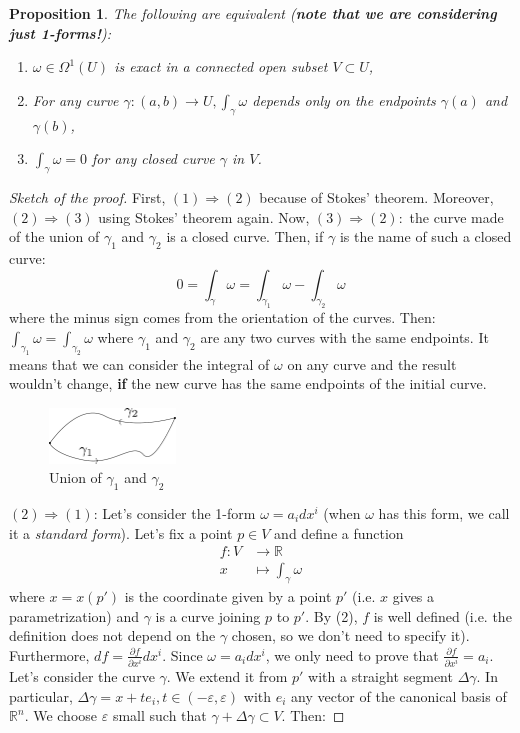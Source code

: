 \documentclass[a4paper,11pt,titlepage, article, oneside]{memoir}
\numberwithin{equation}{section}
\newtheorem{proposition}[theorem]{Proposition}
\theoremstyle{definition}
\theoremstyle{remark}
\newcommand{\rfield}{\mathbb{R}}
\begin{document}
\begin{proposition} \label{propex1forms}
  The following are equivalent (\textbf{note that we are considering just 1-forms!}):
  \begin{enumerate}
    \item $\omega \in \Omega^1(U)$ is exact in a connected open subset $V \subset U$,
    \item For any curve $\gamma \colon (a, b) \rightarrow U, \int_{\gamma} \omega$ depends only on the endpoints $\gamma(a)$ and $\gamma(b)$,
    \item $\int_{\gamma} \omega = 0$ for any closed curve $\gamma$ in $V$.
  \end{enumerate}
\end{proposition}
\begin{proof}[Sketch of the proof]
First, $(1) \Rightarrow (2)$ because of Stokes' theorem. Moreover, $(2) \Rightarrow (3)$ using Stokes' theorem again. Now, $(3) \Rightarrow (2):$ the curve made of the union of $\gamma_1$ and $\gamma_2$ is a closed curve. Then, if $\gamma$ is the name of such a closed curve:
$$0 = \int_{\gamma} \omega = \int_{\gamma_1} \omega - \int_{\gamma_2} \omega$$
where the minus sign comes from the orientation of the curves.
Then: $\int_{\gamma_1} \omega = \int_{\gamma_2} \omega$ where $\gamma_1$ and $\gamma_2$ are any two curves with the same endpoints. It means that we can consider the integral of $\omega$ on any curve and the result  wouldn't change, \textbf{if} the new curve has the same endpoints of the initial curve.
\begin{figure}[H] \label{Fig:closedcurve}
     \centering
     \includegraphics[width=0.3\textwidth]{Images/closedcurve.pdf}
     \caption{Union of $\gamma_1$ and $\gamma_2$}
\end{figure}
$(2) \Rightarrow (1)$: Let's consider the 1-form $\omega = a_i dx^i$ (when $\omega$ has this form, we call it a \textit{standard form}). Let's fix a point $p \in V$ and define a function
\begin{align*}
f \colon V &\rightarrow \rfield \\
x &\mapsto \int_{\gamma} \omega
\end{align*}
where $x = x(p')$ is the coordinate given by a point $p'$ (i.e. $x$ gives a parametrization) and $\gamma$ is a curve joining $p$ to $p'$. By (2), $f$ is well defined (i.e. the definition does not depend on the $\gamma$ chosen, so we don't need to specify it). Furthermore, $df = \frac{\partial f}{\partial x^i} dx^i$. Since $\omega = a_i dx^i$, we only need  to prove that $\frac{\partial f}{\partial x^i} = a_i$. Let's consider the curve $\gamma$. We extend it from $p'$ with a straight segment $\Delta \gamma$. In particular, $\Delta \gamma = x + t e_i, t \in (-\varepsilon, \varepsilon)$ with $e_i$ any vector of the canonical basis of $\rfield^n$. We choose $\varepsilon$ small such that $\gamma + \Delta \gamma \subset V$. Then:

\end{proof}
\end{document}
